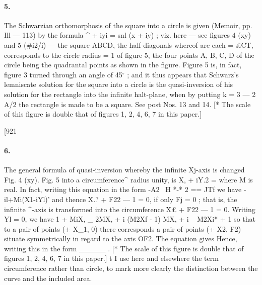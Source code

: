 \documentclass[11pt,a4paper]{book}
\begin{document}
{{{{\paragraph{5.} The    Schwarzian   orthomorphosis    of   the   square    into    a   circle    is   given    (Memoir,
pp.   Ill --- 113)   by   the   formula  ^  +  iyi  =  snl  (x  +  iy) ;    viz.  here --- see  figures  4  (xy)  and  5
(\#i2/i) --- the    square   ABCD,    the    half-diagonals    whereof    are    each   =  £CT,    corresponds    to
the   circle    radius   =  1    of    figure    5,   the    four    points   A,   B,    C,   D    of    the    circle    being
the   quadrantal   points   as   shown    in   the   figure.     Figure    5    is,    in   fact,   figure    3   turned
through    an    angle   of    45$^\circ$ ;   and    it    thus    appears   that    Schwarz's    lemniscate    solution    for
the   square    into    a   circle    is   the    quasi-inversion    of    his    solution    for    the    rectangle    into
the   infinite   halt-plane,   when   by   putting   k  =  3  ---  2  A/2    the    rectangle    is    made    to   be   a
square.     See  post  Nos.  13  and  14.
[*  The  scale  of  this  figure  is  double  that  of  figures  1,  2,  4,  6,  7  in  this  paper.]


[921
\paragraph{6.} The   general   formula   of  quasi-inversion  whereby  the  infinite  Xj-axis  is  changed
Fig.  4  (xy).
Fig.  5
into  a  circumference^  radius  unity,  is
X,  +  iY.2  =
where  M  is  real.     In  fact,  writing  this  equation  in  the  form
-A2  ~H  *-*  2  ==  JTf
we  have
-i{l+Mi(X1-iYl)}'
and  thence   X.?  +  F22  ---  1  =  0,  if  only  Fj  =  0 ;    that  is,  the  infinite  ^-axis  is  transformed
into  the  circumference  X£  +  F22  ---  1  =  0.
Writing  Yl  =  0,  we  have
1  +  MiX,  \_  2MX,  +  i  (M2Xf  -  1)
MX,  +  i  ~  M2Xi*  +  1
so   that   to   a   pair   of    points   ($\pm$  X_1,    0)   there   corresponds    a   pair   of    points   (+  X2,   F2)
situate  symmetrically  in  regard  to  the  axis  OF2.
The  equation  gives
Hence,  writing  this  in  the  form
\_\_\_\_\_ .
[*  The  scale  of  this  figure  is  double  that  of  figures  1,  2,  4,  6,  7  in  this  paper.]
t  I    use    here    and    elsewhere    the    term    circumference    rather    than    circle,    to    mark    more    clearly    the
distinction  between  the  curve  and  the  included  area.


}}}}
\end{document}
